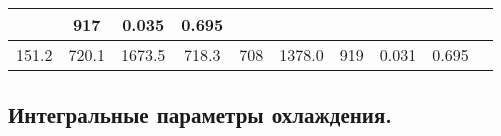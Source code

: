 \documentclass[a4paper,10pt]{article}
\begin{document}
\begin{longtable}{
     |
%    
    c|
%    
    c|
%    
    c|
%    
    c|
%    
    c|
%    
    c|
%    
    c|
%    
    c|
%    
    c|
%    
    c|
%    
    }
%        
        & 917
%        

%        

%        
        & 0.035
%        

%        

%        
        & 0.695
%        

%        
        \\
        \hline

        

%        

%        
        151.2
%        

%        

%        
        & 720.1
%        

%        

%        
        & 1673.5
%        

%        

%        
        & 718.3
%        

%        

%        
        & 708
%        

%        

%        
        & 1378.0
%        

%        

%        
        & 919
%        

%        

%        
        & 0.031
%        

%        

%        
        & 0.695
%        

%        
        \\
        \hline

        
    \end{longtable}
%    

    \subsection{Интегральные параметры охлаждения.}
\end{document}

